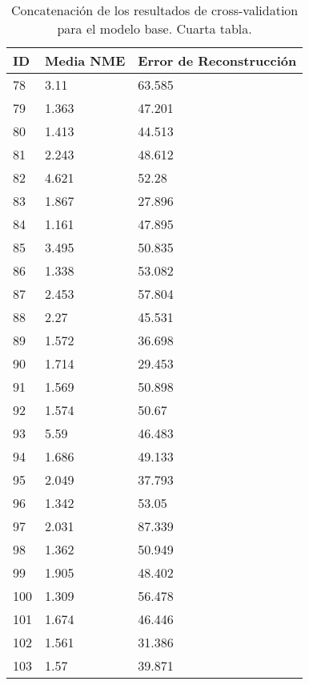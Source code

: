 \begin{table}[!ht]
    \centering
    \caption{Concatenación de los resultados de cross-validation para el modelo base. Cuarta tabla.}
    \begin{tabular}{|l|l|l|}
    \hline
        \cellcolor{gray!25}\textbf{ID} & \cellcolor{gray!25}\textbf{Media NME} & \cellcolor{gray!25}\textbf{Error de Reconstrucción} \\ \hline
        78 & 3.11 & 63.585 \\ \hline
        79 & 1.363 & 47.201 \\ \hline
        80 & 1.413 & 44.513 \\ \hline
        81 & 2.243 & 48.612 \\ \hline
        82 & 4.621 & 52.28 \\ \hline
        83 & 1.867 & 27.896 \\ \hline
        84 & 1.161 & 47.895 \\ \hline
        85 & 3.495 & 50.835 \\ \hline
        86 & 1.338 & 53.082 \\ \hline
        87 & 2.453 & 57.804 \\ \hline
        88 & 2.27 & 45.531 \\ \hline
        89 & 1.572 & 36.698 \\ \hline
        90 & 1.714 & 29.453 \\ \hline
        91 & 1.569 & 50.898 \\ \hline
        92 & 1.574 & 50.67 \\ \hline
        93 & 5.59 & 46.483 \\ \hline
        94 & 1.686 & 49.133 \\ \hline
        95 & 2.049 & 37.793 \\ \hline
        96 & 1.342 & 53.05 \\ \hline
        97 & 2.031 & 87.339 \\ \hline
        98 & 1.362 & 50.949 \\ \hline
        99 & 1.905 & 48.402 \\ \hline
        100 & 1.309 & 56.478 \\ \hline
        101 & 1.674 & 46.446 \\ \hline
        102 & 1.561 & 31.386 \\ \hline
        103 & 1.57 & 39.871 \\ \hline
    \end{tabular}
    \label{table:ModelBase_landmarkresume}
\end{table}

